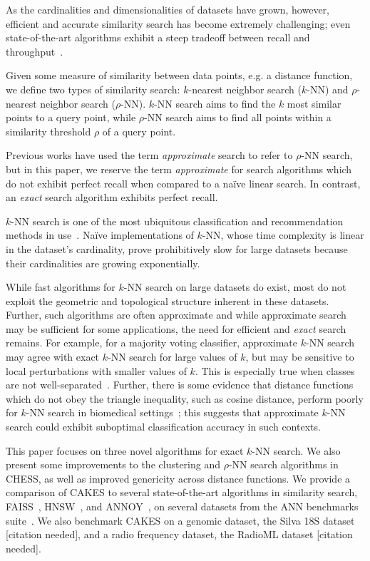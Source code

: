 As the cardinalities and dimensionalities of datasets have grown, however, efficient and accurate similarity search has become extremely challenging; 
even state-of-the-art algorithms exhibit a steep tradeoff between recall and throughput~\cite{ishaq2019clustered}.

Given some measure of similarity between data points, e.g. a distance function, we define two types of similarity search: $k$-nearest neighbor search ($k$-NN) and $\rho$-nearest neighbor search ($\rho$-NN).
$k$-NN search aims to find the $k$ most similar points to a query point, while $\rho$-NN search aims to find all points within a similarity threshold $\rho$ of a query point.

Previous works have used the term \emph{approximate} search to refer to $\rho$-NN search, but in this paper, we reserve the term \emph{approximate} for search algorithms which do not exhibit perfect recall when compared to a na\"{i}ve linear search.
In contrast, an \emph{exact} search algorithm exhibits perfect recall.

$k$-NN search is one of the most ubiquitous classification and recommendation methods in use~\cite{fix1952discriminatory, cover1967nearest}.
Na\"{i}ve implementations of $k$-NN, whose time complexity is linear in the dataset's cardinality, prove prohibitively slow for large datasets because their cardinalities are growing exponentially.

While fast algorithms for $k$-NN search on large datasets do exist, most do not exploit the geometric and topological structure inherent in these datasets.
Further, such algorithms are often approximate and while approximate search may be sufficient for some applications, the need for efficient and \emph{exact} search remains.
For example, for a majority voting classifier, approximate $k$-NN search may agree with exact $k$-NN search for large values of $k$, but may be sensitive to local perturbations with smaller values of $k$.
This is especially true when classes are not well-separated~\cite{zhang2022imbalanced}.
Further, there is some evidence that distance functions which do not obey the triangle inequality, such as cosine distance, perform poorly for $k$-NN search in biomedical settings~\cite{hu2016distance};
this suggests that approximate $k$-NN search could exhibit suboptimal classification accuracy in such contexts.

This paper focuses on three novel algorithms for exact $k$-NN search.
We also present some improvements to the clustering and $\rho$-NN search algorithms in CHESS, as well as improved genericity across distance functions.
We provide a comparison of CAKES to several state-of-the-art algorithms in similarity search, FAISS~\cite{johnson2019billion}, HNSW~\cite{malkov2016hnsw}, and ANNOY~\cite{annoy}, on several datasets from the ANN benchmarks suite~\cite{aumuller2020ann}.
We also benchmark CAKES on a genomic dataset, the Silva 18S dataset [citation needed], and a radio frequency dataset, the RadioML dataset [citation needed].


